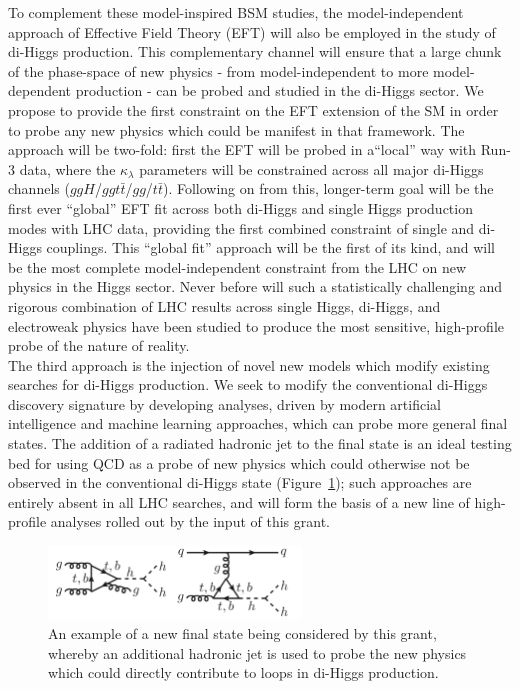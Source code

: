 \documentclass[10pt,oneside,notitlepage,abstracton,a4paper]{scrartcl}
\begin{document}
To complement these model-inspired BSM studies, the model-independent approach of Effective Field Theory (EFT) will also be employed in the study of di-Higgs production. This complementary channel will ensure that a large chunk of the phase-space of new physics - from model-independent to more model-dependent production - can be probed and studied in the di-Higgs sector. We propose to provide the first constraint on the EFT extension of the SM in order to probe any new physics which could be manifest in that framework. The approach will be two-fold: first the EFT will be probed in a``local” way with Run-3 data, where the $\kappa_{\lambda}$ parameters will be constrained across all major di-Higgs channels ($ggH$/$ggt\bar{t}$/$gg$/$t\bar{t}$). Following on from this, longer-term goal will be the first ever ``global” EFT fit across both di-Higgs and single Higgs production modes with LHC data, providing the first combined constraint of single and di-Higgs couplings. This ``global fit'' approach will be the first of its kind, and will be the most complete model-independent constraint from the LHC on new physics in the Higgs sector. Never before will such a statistically challenging and rigorous combination of LHC results across single Higgs, di-Higgs, and electroweak physics have been studied to produce the most sensitive, high-profile probe of the nature of reality. \\

The third approach is the injection of novel new models which modify existing searches for di-Higgs production. We seek to modify the conventional di-Higgs discovery signature by developing analyses, driven by modern artificial intelligence and machine learning approaches, which can probe more general final states. The addition of a radiated hadronic jet to the final state is an ideal testing bed for using QCD as a probe of new physics which could otherwise not be observed in the conventional di-Higgs state (Figure~\ref{fig:addJet}); such approaches are entirely absent in all LHC searches, and will form the basis of a new line of high-profile analyses rolled out by the input of this grant. \\

\begin{figure}[!ht]
\centering
\includegraphics[width=0.6\textwidth]{Figures/addJet}
\caption{An example of a new final state being considered by this grant, whereby an additional hadronic jet is used to probe the new physics which could directly contribute to loops in di-Higgs production.}
\label{fig:addJet}
\end{figure}
\end{document}
